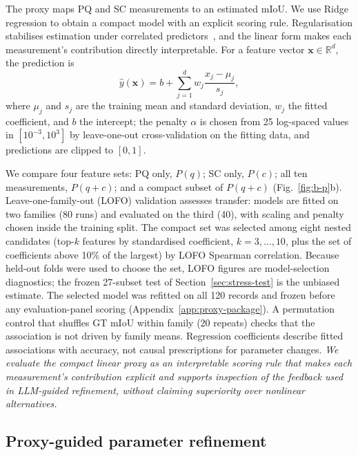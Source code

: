 \documentclass[a4paper,fleqn]{cas-dc}
\begin{document}
The proxy maps PQ and SC measurements to an estimated mIoU. We use Ridge regression to obtain a compact model with an explicit scoring rule. Regularisation stabilises estimation under correlated predictors~\cite{hoerl1970ridge,pedregosa2011sklearn}, and the linear form makes each measurement's contribution directly interpretable. For a feature vector $\mathbf{x}\in\mathbb{R}^{d}$, the prediction is
\begin{equation}
\hat{y}(\mathbf{x})
=
b+\sum_{j=1}^{d}
w_j\frac{x_j-\mu_j}{s_j},
\label{eq:ridge-proxy}
\end{equation}
where $\mu_j$ and $s_j$ are the training mean and standard deviation, $w_j$ the fitted coefficient, and $b$ the intercept; the penalty $\alpha$ is chosen from 25 log-spaced values in $[10^{-3},10^{3}]$ by leave-one-out cross-validation on the fitting data, and predictions are clipped to $[0,1]$.

We compare four feature sets: PQ only, $P(q)$; SC only, $P(c)$; all ten measurements, $P(q{+}c)$; and a compact subset of $P(q{+}c)$ (Fig.~\ref{fig:b-p}b). Leave-one-family-out (LOFO) validation assesses transfer: models are fitted on two families (80 runs) and evaluated on the third (40), with scaling and penalty chosen inside the training split. The compact set was selected among eight nested candidates (top-$k$ features by standardised coefficient, $k=3,\ldots,10$, plus the set of coefficients above 10\% of the largest) by LOFO Spearman correlation. Because held-out folds were used to choose the set, LOFO figures are model-selection diagnostics; the frozen 27-subset test of Section~\ref{sec:stress-test} is the unbiased estimate. The selected model was refitted on all 120 records and frozen before any evaluation-panel scoring (Appendix~\ref{app:proxy-package}). A permutation control that shuffles GT mIoU within family (20 repeats) checks that the association is not driven by family means. Regression coefficients describe fitted associations with accuracy, not causal prescriptions for parameter changes. \textit{We evaluate the compact linear proxy as an interpretable scoring rule that makes each measurement's contribution explicit and supports inspection of the feedback used in LLM-guided refinement, without claiming superiority over nonlinear alternatives.}

\subsection{Proxy-guided parameter refinement}
\label{sec:agent-design}
\end{document}
